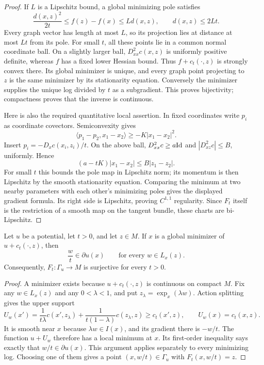 \begin{proof}
If $L$ is a Lipschitz bound, a global minimizing pole satisfies
\[
 \frac{d(x,z)^2}{2t}\leq f(z)-f(x)\leq Ld(x,z),
 \qquad d(x,z)\leq2Lt.
\]
Every graph vector has length at most $L$, so its projection lies at
distance at most $Lt$ from its pole.  For small $t$, all these points
lie in a common normal coordinate ball.  On a slightly larger ball,
$D^2_{xx}c(x,z)$ is uniformly positive definite, whereas $f$ has a
fixed lower Hessian bound.  Thus $f+c_t(\cdot,z)$ is strongly convex
there.  Its global minimizer is unique, and every graph point projecting
to $z$ is the same minimizer by its stationarity equation.  Conversely
the minimizer supplies the unique log divided by $t$ as a subgradient.
This proves bijectivity; compactness proves that the inverse is
continuous.

Here is also the required quantitative local assertion. In fixed
coordinates write $p_i$ as coordinate covectors. Semiconvexity gives
\[
 \langle p_1-p_2,x_1-x_2\rangle\geq-K|x_1-x_2|^2.
\]
Insert $p_i=-D_xc(x_i,z_i)/t$.  On the above ball,
$D^2_{xx}c\geq a\mathrm{Id}$ and $|D^2_{xz}c|\leq B$, uniformly.  Hence
\[
 (a-tK)|x_1-x_2|\leq B|z_1-z_2|.
\]
For small $t$ this bounds the pole map in Lipschitz norm; its momentum
is then Lipschitz by the smooth stationarity equation.  Comparing
the minimum at two nearby parameters with each other's minimizing
poles gives the displayed gradient formula.  Its right side is
Lipschitz, proving $C^{1,1}$ regularity.  Since $F_t$ itself is the
restriction of a smooth map on the tangent bundle, these charts are
bi-Lipschitz.
\end{proof}

\begin{lemma}
\label{geo:minimizer-capture}
Let $u$ be a potential, let $t>0$, and let $z\in M$.
If $x$ is a global minimizer of $u+c_t(\cdot,z)$, then
\[
 \frac wt\in\partial u(x)\qquad\text{for every }w\in L_x(z).
\]
Consequently, $F_t:\Gamma_u\to M$ is surjective for every $t>0$.
\end{lemma}

\begin{proof}
A minimizer exists because $u+c_t(\cdot,z)$ is continuous on compact
$M$. Fix any $w\in L_x(z)$ and any $0<\lambda<1$, and put
$z_\lambda=\exp_x(\lambda w)$. Action splitting gives the upper support
\[
 U_w(x')=\frac1{t\lambda}c(x',z_\lambda)
          +\frac1{t(1-\lambda)}c(z_\lambda,z)
 \geq c_t(x',z),
 \qquad U_w(x)=c_t(x,z).
\]
It is smooth near $x$ because $\lambda w\in I(x)$, and its gradient
there is $-w/t$. The function $u+U_w$ therefore has a local minimum
at $x$. Its first-order inequality says exactly that
$w/t\in\partial u(x)$. This argument applies separately to every
minimizing log. Choosing one of them gives a point
$(x,w/t)\in\Gamma_u$ with $F_t(x,w/t)=z$.
\end{proof}


